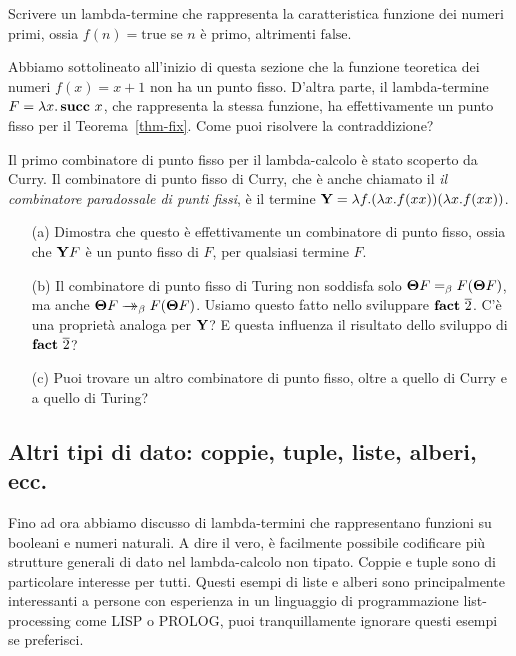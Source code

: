 \documentclass{article}
\begin{document}
\begin{exercise}
  Scrivere un lambda-termine che rappresenta la caratteristica
  funzione dei numeri primi, ossia $f(n)=\mbox{true}$ se $n$ \`e
  primo, altrimenti $\mbox{false}$. 
\end{exercise}

\begin{exercise}
  Abbiamo sottolineato all'inizio di questa sezione che
  la funzione teoretica dei numeri $f(x)=x+1$ non ha un
  punto fisso. D'altra parte, il lambda-termine $F=\lambda x.\mathop{\textbf{\bf succ}\,} x$,
  che rappresenta la stessa funzione, ha effettivamente un punto fisso per
  il Teorema~\ref{thm-fix}. Come puoi risolvere la contraddizione?
\end{exercise}

\begin{exercise}
  Il primo combinatore di punto fisso per il lambda-calcolo \`e stato
  scoperto da Curry. Il combinatore di punto fisso di Curry, che \`e anche chiamato il
  {\em il combinatore paradossale di punti fissi}, \`e il termine ${\bf Y}=\lambda f.(\lambda
  x.f(xx))(\lambda x.f(xx))$.
  \begin{enumerate}
  \item[(a)] Dimostra che questo \`e effettivamente un combinatore di punto fisso,
  ossia che ${\bf Y} F$ \`e un punto fisso di $F$, per qualsiasi termine $F$.
  \item[(b)] Il combinatore di punto fisso di Turing non soddisfa solo $\textbf{\boldmath $\Theta$}
    F=_{\beta} F(\textbf{\boldmath $\Theta$} F)$, ma anche $\textbf{\boldmath $\Theta$} F\mathrel{\rightarrow\!\!\!\!\!\rightarrow}_{\beta} F(\textbf{\boldmath $\Theta$} F)$. Usiamo
    questo fatto nello sviluppare $\mathop{\textbf{\bf fact}\,}\mathop{\overline{2}}$. C'\`e una propriet\`a analoga per ${\bf Y}$? 
    E questa influenza il risultato dello sviluppo di $\mathop{\textbf{\bf fact}\,}\mathop{\overline{2}}$?
  \item[(c)] Puoi trovare un altro combinatore di punto fisso, oltre
  a quello di Curry e a quello di Turing?
  \end{enumerate}
\end{exercise}

\subsection{Altri tipi di dato: coppie, tuple, liste, alberi, ecc.}

Fino ad ora abbiamo discusso di lambda-termini che rappresentano funzioni
su booleani e numeri naturali. A dire il vero, \`e facilmente possibile codificare
pi\`u strutture generali di dato nel lambda-calcolo non tipato. Coppie e tuple
sono di particolare interesse per tutti. Questi esempi di liste e alberi sono
principalmente interessanti a persone con esperienza in
un linguaggio di programmazione list-processing come LISP o PROLOG, puoi
tranquillamente ignorare questi esempi se preferisci.
\end{document}
